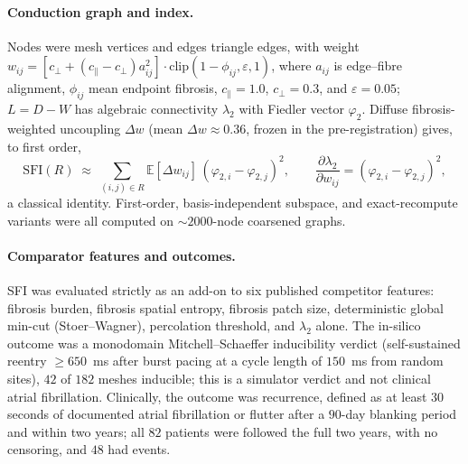 \documentclass[11pt]{article}
\newcommand{\lam}{\lambda}
\newcommand{\phii}{\varphi}
\newcommand{\SFI}{\ensuremath{\mathrm{SFI}}}
\begin{document}
\paragraph{Conduction graph and index.} Nodes were mesh vertices and edges
triangle edges, with weight
$w_{ij}=[c_\perp+(c_\parallel-c_\perp)a_{ij}^{2}]\cdot\mathrm{clip}(1-\phi_{ij},\varepsilon,1)$,
where $a_{ij}$ is edge--fibre alignment, $\phi_{ij}$ mean endpoint fibrosis,
$c_\parallel=1.0$, $c_\perp=0.3$, and $\varepsilon=0.05$; $L=D-W$ has algebraic
connectivity $\lam_2$ with Fiedler vector $\phii_2$. Diffuse fibrosis-weighted
uncoupling $\Delta w$ (mean $\Delta w\approx0.36$, frozen in the pre-registration)
gives, to first order,
\begin{equation}
\SFI(R)\;\approx\;\sum_{(i,j)\in R}\mathbb{E}[\Delta w_{ij}]\,
(\phii_{2,i}-\phii_{2,j})^{2},
\qquad
\frac{\partial\lam_2}{\partial w_{ij}}=(\phii_{2,i}-\phii_{2,j})^{2},
\end{equation}
a classical identity. First-order, basis-independent subspace, and
exact-recompute variants were all computed on $\sim\!2000$-node coarsened graphs.

\paragraph{Comparator features and outcomes.} SFI was evaluated strictly as an
add-on to six published competitor features: fibrosis burden,
fibrosis spatial entropy, fibrosis patch size, deterministic global min-cut
(Stoer--Wagner), percolation threshold, and $\lam_2$ alone. The in-silico outcome
was a monodomain Mitchell--Schaeffer\cite{mitchell2003} inducibility verdict (self-sustained reentry
$\geq650$~ms after burst pacing at a cycle length of $150$~ms from random sites),
$42$ of $182$ meshes inducible; this is a simulator verdict and not clinical
atrial fibrillation. Clinically, the outcome was recurrence, defined as at least
$30$ seconds of documented atrial fibrillation or flutter after a $90$-day
blanking period and within two years; all $82$ patients were followed the full
two years, with no censoring, and $48$ had events.
\end{document}
